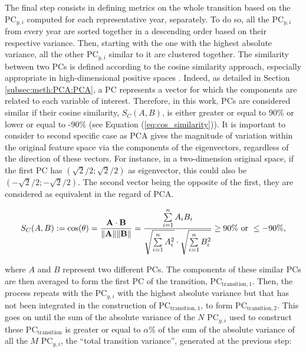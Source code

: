 \noindent
The final step consists in defining metrics on the whole transition based on the $\text{PC}_{y,i}$ computed for each representative year, separately. To do so, all the $\text{PC}_{y,i}$ from every year are sorted together in a descending order based on their respective variance. Then, starting with the one with the highest absolute variance, all the other $\text{PC}_{y,i}$ similar to it are clustered together. The similarity between two PCs is defined according to the cosine similarity approach, especially appropriate in high-dimensional positive spaces \cite{xia2015learning}. Indeed, as detailed in Section \ref{subsec:meth:PCA:PCA}, a PC represents a vector for which the components are related to each variable of interest. Therefore, in this work, PCs are considered similar if their cosine similarity, $S_C (A,B)$, is either greater or equal to 90\% or lower or equal to -90\% (see Equation (\ref{eq:cos_similarity})). It is important to consider to second specific case as \gls{PCA} gives the magnitude of variation within the original feature space via the components of the eigenvectors, regardless of the direction of these vectors. For instance, in a two-dimension original space, if the first PC has $(\sqrt{2}/2;\sqrt{2}/2)$ as eigenvector, this could also be $(-\sqrt{2}/2;-\sqrt{2}/2)$. The second vector being the opposite of the first, they are considered as equivalent in the regard of \gls{PCA}.

\begin{equation}
\label{eq:cos_similarity}
S_C (A,B):= \cos(\theta) = {\mathbf{A} \cdot \mathbf{B} \over \|\mathbf{A}\| \|\mathbf{B}\|} = \frac{ \sum\limits_{i=1}^{n}{A_i  B_i} }{ \sqrt{\sum\limits_{i=1}^{n}{A_i^2}} \cdot \sqrt{\sum\limits_{i=1}^{n}{B_i^2}} } \geq 90\%\text{ or } \leq -90\%,
\end{equation}

\noindent
where $A$ and $B$ represent two different PCs.  The components of these similar PCs are then averaged to form the first PC of the transition, $\text{PC}_{\text{transition},1}$. Then, the process repeats with the $\text{PC}_{y,i}$ with the highest absolute variance but that has not been integrated in the construction of $\text{PC}_{\text{transition},1}$, to form $\text{PC}_{\text{transition},2}$. This goes on until the sum of the absolute variance of the $N$ $\text{PC}_{y,i}$ used to construct these $\text{PC}_{\text{transition}}$ is greater or equal to $\alpha$\% of the sum of the absolute variance of all the $M$ $\text{PC}_{y,i}$, \ie the ``total transition variance'', generated at the previous step:

